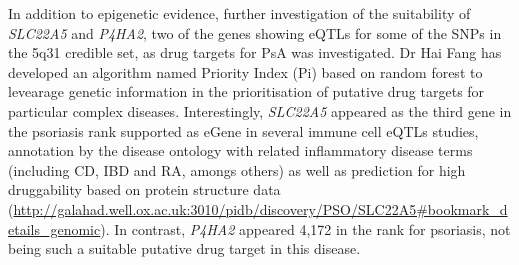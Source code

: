In addition to epigenetic evidence, further investigation of the suitability of \textit{SLC22A5} and \textit{P4HA2}, two of the genes showing eQTLs for some of the SNPs in the 5q31 credible set, as drug targets for PsA was investigated. Dr Hai Fang has developed an algorithm named Priority Index (Pi) based on random forest to levearage genetic information in the prioritisation of putative drug targets for particular complex diseases. Interestingly, \textit{SLC22A5} appeared as the third gene in the psoriasis rank supported as eGene in several immune cell eQTLs studies, annotation by the disease ontology with related inflammatory disease terms (including CD, IBD and RA, amongs others) as well as prediction for high druggability based on protein structure data (\url{http://galahad.well.ox.ac.uk:3010/pidb/discovery/PSO/SLC22A5#bookmark_details_genomic}). In contrast, \textit{P4HA2} appeared 4,172 in the rank for psoriasis, not being such a suitable putative drug target in this disease. 



